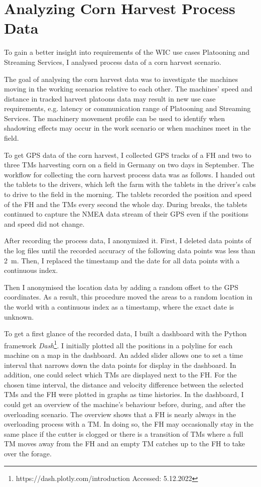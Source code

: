 \chapter{Analyzing Corn Harvest Process Data}

To gain a better insight into requirements of the \ac{WIC} use cases Platooning and Streaming Services, I analysed process data of a corn harvest scenario.

The goal of analysing the corn harvest data was to investigate the machines moving in the working scenarios relative to each other. The machines' speed and distance in tracked harvest platoons data may result in new use case requirements, e.g. latency or communication range of Platooning and Streaming Services. The machinery movement profile can be used to identify when shadowing effects may occur in the work scenario or when machines meet in the field.

To get GPS data of the corn harvest,
I collected GPS tracks of a \ac{FH} and two to three \ac{TM}s harvesting corn on a field in Germany on two days in September.
The workflow for collecting the corn harvest process data was as follows. 
I handed out the tablets to the drivers, which left the farm with the tablets in the driver's cabs to drive to
the field in the morning. The tablets recorded the position and speed of the \ac{FH} and the \ac{TM}s every second the whole day.
During breaks, the tablets continued to capture the NMEA data stream of their GPS even if the positions and speed did not change.

After recording the process data, I anonymized it. 
First, I deleted data points of the log files until the recorded accuracy of the following data points was less than \SI{2}{\metre}. Then, I replaced the timestamp and the date for all data points with a continuous index.

Then I anonymised the location data by adding a random offset to the GPS coordinates. As a result, this procedure moved the areas to a random location in the world with a continuous index as a timestamp, where the exact date is unknown.

To get a first glance of the recorded data, I built a dashboard with the Python framework \textit{Dash}\footnote{https://dash.plotly.com/introduction Accessed: 5.12.2022}. I initially plotted all the positions in a polyline for each machine
on a map in the dashboard. An added slider allows one to set a time interval that narrows down the data points for display in the dashboard. In addition, one could select which \ac{TM}s are displayed next to the \ac{FH}. For the chosen time interval, the distance and velocity difference between the selected \ac{TM}s and the \ac{FH} were plotted in graphs as time histories.
In the dashboard, I could get an overview of the machine's behaviour 
before, during, and after the overloading scenario.
The overview shows that a \ac{FH} is nearly always in the overloading process with a \ac{TM}. In doing so, the \ac{FH} may occasionally stay in the same place if the cutter is clogged or there is a transition of \ac{TM}s where a full \ac{TM} moves away from the \ac{FH} and an empty \ac{TM} catches up to the \ac{FH} to take over the forage.

